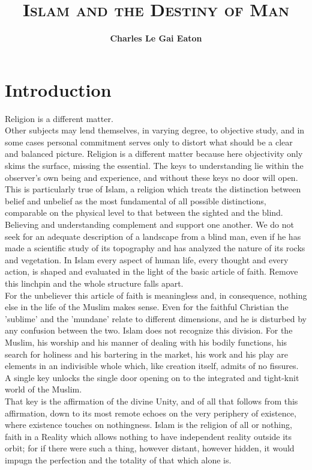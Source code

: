 \documentclass[11pt, b5paper, twoside]{book}
\title{\LARGE \textbf{\textsc{Islam and the Destiny of Man}}}
\author{\Large \textbf{Charles Le Gai Eaton}}
\date{ }
\begin{document}
\frontmatter
\maketitle
\tableofcontents


\newpage
\chapter*{Introduction}

Religion is a different matter.\\

Other subjects may lend themselves, in varying degree, to objective study, and in some cases personal commitment serves only to distort what should be a clear and balanced picture. Religion is a different matter because here objectivity only skims the surface, missing the essential. The keys to understanding lie within the observer's own being and experience, and without these keys no door will open. This is particularly true of Islam, a religion which treats the distinction between belief and unbelief as the most fundamental of all possible distinctions, comparable on the physical level to that between the sighted and the blind. Believing and understanding complement and support one another. We do not seek for an adequate description of a landscape from a blind man, even if he has made a scientific study of its topography and has analyzed the nature of its rocks and vegetation. In Islam every aspect of human life, every thought and every action, is shaped and evaluated in the light of the basic article of faith. Remove this linchpin and the whole structure falls apart.\\

For the unbeliever this article of faith is meaningless and, in consequence, nothing else in the life of the Muslim makes sense. Even for the faithful Christian the 'sublime' and the 'mundane' relate to different dimensions, and he is disturbed by any confusion between the two. Islam does not recognize this division. For the Muslim, his worship and his manner of dealing with his bodily functions, his search for holiness and his bartering in the market, his work and his play are elements in an indivisible whole which, like creation itself, admits of no fissures. A single key unlocks the single door opening on to the integrated and tight-knit world of the Muslim.\\

That key is the affirmation of the divine Unity, and of all that follows from this affirmation, down to its most remote echoes on the very periphery of existence, where existence touches on nothingness. Islam is the religion of all or nothing, faith in a Reality which allows nothing to have independent reality outside its orbit; for if there were such a thing, however distant, however hidden, it would impugn the perfection and the totality of that which alone is.\\
\end{document}
